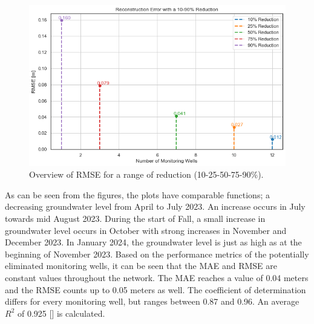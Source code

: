 \begin{figure}[h]
    \centering
    \includegraphics[width=0.60\linewidth]{frontmatter/Heijplaat-fig/redscenheij.png}
    \caption{Overview of RMSE for a range of reduction (10-25-50-75-90\%).}
    \label{rmseheij}
\end{figure}
\newpage
\noindent
As can be seen from the figures, the plots have comparable functions; a decreasing groundwater level from April to July 2023. An increase occurs in July towards mid August 2023. During the start of Fall, a small increase in groundwater level occurs in October with strong increases in November and December 2023. In January 2024, the groundwater level is just as high as at the beginning of November 2023. Based on the performance metrics of the potentially eliminated monitoring wells, it can be seen that the MAE and RMSE are constant values throughout the network. The MAE reaches a value of 0.04 meters and the RMSE counts up to 0.05 meters as well. The coefficient of determination differs for every monitoring well, but ranges between 0.87 and 0.96. An average $R^2$ of 0.925 [] is calculated.
